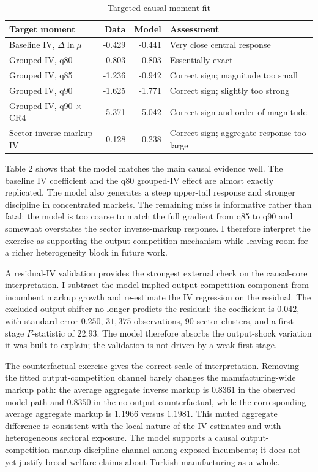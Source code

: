 \documentclass[11pt,a4paper]{article}
\begin{document}
\begin{table}[h!]
\centering
\caption{Targeted causal moment fit}
\begin{threeparttable}
\small
\begin{tabular}{lrrl}
\toprule
Target moment & Data & Model & Assessment \\
\midrule
Baseline IV, \(\Delta\ln\mu\) & -0.429 & -0.441 & Very close central response \\
Grouped IV, q80 & -0.803 & -0.803 & Essentially exact \\
Grouped IV, q85 & -1.236 & -0.942 & Correct sign; magnitude too small \\
Grouped IV, q90 & -1.625 & -1.771 & Correct sign; slightly too strong \\
Grouped IV, q90 \(\times\) CR4 & -5.371 & -5.042 & Correct sign and order of magnitude \\
Sector inverse-markup IV & 0.128 & 0.238 & Correct sign; aggregate response too large \\
\bottomrule
\end{tabular}
\end{threeparttable}
\end{table}

Table 2 shows that the model matches the main causal evidence well. The baseline IV coefficient and the q80 grouped-IV effect are almost exactly replicated. The model also generates a steep upper-tail response and stronger discipline in concentrated markets. The remaining miss is informative rather than fatal: the model is too coarse to match the full gradient from q85 to q90 and somewhat overstates the sector inverse-markup response. I therefore interpret the exercise as supporting the output-competition mechanism while leaving room for a richer heterogeneity block in future work.

A residual-IV validation provides the strongest external check on the causal-core interpretation. I subtract the model-implied output-competition component from incumbent markup growth and re-estimate the IV regression on the residual. The excluded output shifter no longer predicts the residual: the coefficient is \(0.042\), with standard error \(0.250\), \(31{,}375\) observations, 90 sector clusters, and a first-stage \(F\)-statistic of \(22.93\). The model therefore absorbs the output-shock variation it was built to explain; the validation is not driven by a weak first stage.

The counterfactual exercise gives the correct scale of interpretation. Removing the fitted output-competition channel barely changes the manufacturing-wide markup path: the average aggregate inverse markup is \(0.8361\) in the observed model path and \(0.8350\) in the no-output counterfactual, while the corresponding average aggregate markup is \(1.1966\) versus \(1.1981\). This muted aggregate difference is consistent with the local nature of the IV estimates and with heterogeneous sectoral exposure. The model supports a causal output-competition markup-discipline channel among exposed incumbents; it does not yet justify broad welfare claims about Turkish manufacturing as a whole.
\end{document}
